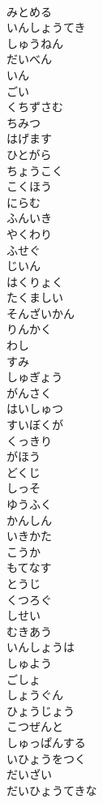 \documentclass[8pt]{extreport}
\begin{document}
\begin{CJK}{UTF8}{min}
\\	みとめる
\\	いんしょうてき
\\	しゅうねん
\\	だいべん
\\	いん
\\	ごい
\\	くちずさむ
\\	ちみつ
\\	はげます
\\	ひとがら
\\	ちょうこく
\\	こくほう
\\	にらむ
\\	ふんいき
\\	やくわり
\\	ふせぐ
\\	じいん
\\	はくりょく
\\	たくましい
\\	そんざいかん
\\	りんかく
\\	わし
\\	すみ
\\	しゅぎょう
\\	がんさく
\\	はいしゅつ
\\	すいぼくが
\\	くっきり
\\	がほう
\\	どくじ
\\	しっそ
\\	ゆうふく
\\	かんしん
\\	いきかた
\\	こうか
\\	もてなす
\\	とうじ
\\	くつろぐ
\\	しせい
\\	むきあう
\\	いんしょうは
\\	しゅよう
\\	ごしょ
\\	しょうぐん
\\	ひょうじょう
\\	こつぜんと
\\	しゅっぱんする
\\	いひょうをつく
\\	だいざい
\\	だいひょうてきな

\end{CJK}
\end{document}
